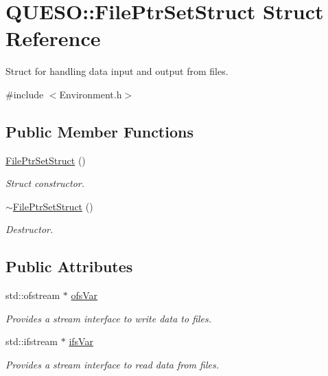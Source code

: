 \hypertarget{struct_q_u_e_s_o_1_1_file_ptr_set_struct}{\section{Q\-U\-E\-S\-O\-:\-:File\-Ptr\-Set\-Struct Struct Reference}
\label{struct_q_u_e_s_o_1_1_file_ptr_set_struct}
}


Struct for handling data input and output from files.  




{\ttfamily \#include $<$Environment.\-h$>$}

\subsection*{Public Member Functions}
\begin{DoxyCompactItemize}
\item 
\hyperlink{struct_q_u_e_s_o_1_1_file_ptr_set_struct_a2f8c1b44d5958fcc6716aecde4cad403}{File\-Ptr\-Set\-Struct} ()
\begin{DoxyCompactList}\small\item\em Struct constructor. \end{DoxyCompactList}\item 
\hyperlink{struct_q_u_e_s_o_1_1_file_ptr_set_struct_a61639fac9716c69ceebe1750aeebe786}{$\sim$\-File\-Ptr\-Set\-Struct} ()
\begin{DoxyCompactList}\small\item\em Destructor. \end{DoxyCompactList}\end{DoxyCompactItemize}
\subsection*{Public Attributes}
\begin{DoxyCompactItemize}
\item 
std\-::ofstream $\ast$ \hyperlink{struct_q_u_e_s_o_1_1_file_ptr_set_struct_a354cb0a6659254aa38ba38986ccf5c8a}{ofs\-Var}
\begin{DoxyCompactList}\small\item\em Provides a stream interface to write data to files. \end{DoxyCompactList}\item 
std\-::ifstream $\ast$ \hyperlink{struct_q_u_e_s_o_1_1_file_ptr_set_struct_a1faa6ed0771368358c29a492edf764ee}{ifs\-Var}
\begin{DoxyCompactList}\small\item\em Provides a stream interface to read data from files. \end{DoxyCompactList}\end{DoxyCompactItemize}


